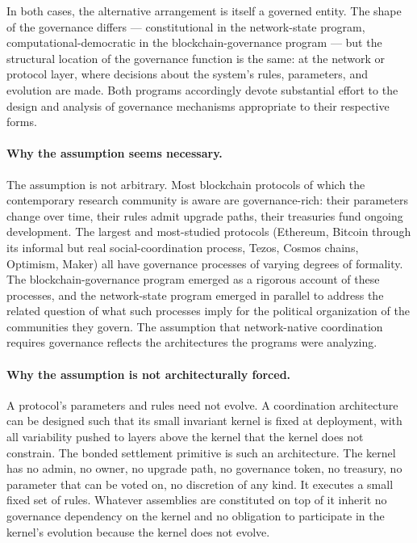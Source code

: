 \documentclass[11pt,a4paper]{article}
\theoremstyle{remark}
\begin{document}
In both cases, the alternative arrangement is itself a governed
entity. The shape of the governance differs --- constitutional
in the network-state program, computational-democratic in the
blockchain-governance program --- but the structural location of
the governance function is the same: at the network or protocol
layer, where decisions about the system's rules, parameters,
and evolution are made. Both programs accordingly devote
substantial effort to the design and analysis of governance
mechanisms appropriate to their respective forms.

\paragraph{Why the assumption seems necessary.}
The assumption is not arbitrary. Most blockchain protocols of
which the contemporary research community is aware are
governance-rich: their parameters change over time, their rules
admit upgrade paths, their treasuries fund ongoing development.
The largest and most-studied protocols (Ethereum, Bitcoin
through its informal but real social-coordination process,
Tezos, Cosmos chains, Optimism, Maker) all have governance
processes of varying degrees of formality. The
blockchain-governance program emerged as a rigorous account of
these processes, and the network-state program emerged in
parallel to address the related question of what such processes
imply for the political organization of the communities they
govern. The assumption that network-native coordination requires
governance reflects the architectures the programs were
analyzing.

\paragraph{Why the assumption is not architecturally forced.}
A protocol's parameters and rules need not evolve. A coordination
architecture can be designed such that its small invariant kernel
is fixed at deployment, with all variability pushed to layers
above the kernel that the kernel does not constrain. The bonded
settlement primitive is such an architecture. The kernel has no
admin, no owner,
no upgrade path, no governance token, no treasury, no parameter
that can be voted on, no discretion of any kind. It executes a
small fixed set of rules. Whatever assemblies are constituted on
top of it inherit no governance dependency on the kernel and no
obligation to participate in the kernel's evolution because the
kernel does not evolve.
\end{document}
